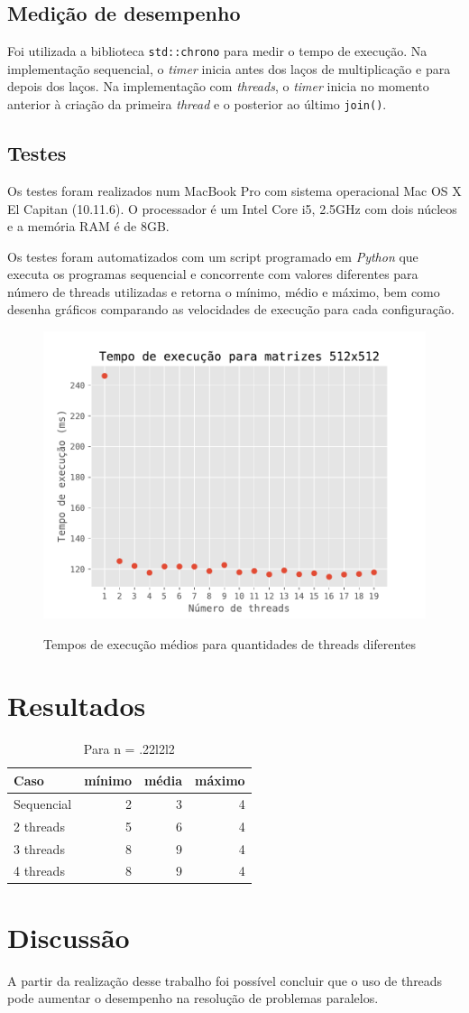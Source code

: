 \documentclass[12pt, a4paper]{article}
\newcommand{\code}[1]{{\lstinline{#1}}}
\begin{document}
\subsection{Medição de desempenho}
Foi utilizada a biblioteca \code{std::chrono} para medir o tempo de execução.
Na implementação sequencial, o \emph{timer} inicia antes dos laços de
multiplicação e para depois dos laços. Na implementação com \emph{threads}, o
\emph{timer} inicia no momento anterior à criação da primeira \emph{thread} e o
posterior ao último \code{join()}.

\subsection{Testes}
Os testes foram realizados num MacBook Pro com sistema operacional Mac OS X El
Capitan (10.11.6). O processador é um Intel Core i5, 2.5GHz com dois núcleos e
a memória RAM é de 8GB.

Os testes foram automatizados com um script programado em \emph{Python} que
executa os programas sequencial e concorrente com valores diferentes para
número de threads utilizadas e retorna o mínimo, médio e máximo, bem como
desenha gráficos comparando as velocidades de execução para cada configuração.

\begin{figure}[h]
\centering
\includegraphics[width=.7\textwidth]{512_20threads}
\label{fig:f2}
\caption{Tempos de execução médios para quantidades de threads diferentes}
\end{figure}

\section{Resultados}
\begin{table}[h]\footnotesize
    \centering
    \begin{tabular}{ l | r r r }
        Caso      & mínimo & média & máximo \\
        \hline
        Sequencial & 2 & 3 & 4 \\
        2 threads  & 5 & 6 & 4 \\
        3 threads  & 8 & 9 & 4 \\
        4 threads  & 8 & 9 & 4 \\
    \end{tabular}
  \caption{Para n = .22l2l2}
\end{table}

\section{Discussão}
A partir da realização desse trabalho foi possível concluir que o uso de
threads pode aumentar o desempenho na resolução de problemas paralelos.
\end{document}
